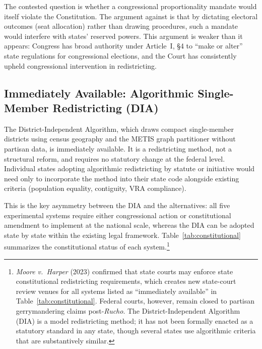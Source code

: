 The contested question is whether a congressional proportionality mandate would
itself violate the Constitution.  The argument against is that by dictating
electoral outcomes (seat allocation) rather than drawing procedures, such a
mandate would interfere with states' reserved powers.  This argument is weaker
than it appears: Congress has broad authority under Article~I, \S4 to
``make or alter'' state regulations for congressional elections, and the
Court has consistently upheld congressional intervention in redistricting.

\subsection{Immediately Available: Algorithmic Single-Member Redistricting (DIA)}

The District-Independent Algorithm, which draws compact single-member districts
using census geography and the METIS graph partitioner without partisan data,
is immediately available.  It is a redistricting method, not a structural
reform, and requires no statutory change at the federal level.  Individual
states adopting algorithmic redistricting by statute or initiative would need
only to incorporate the method into their state code alongside existing criteria
(population equality, contiguity, VRA compliance).

This is the key asymmetry between the DIA and the alternatives: all five
experimental systems require either congressional action or constitutional
amendment to implement at the national scale, whereas the DIA can be adopted
state by state within the existing legal framework.  Table~\ref{tab:constitutional}
summarizes the constitutional status of each system.\footnote{\emph{Moore v.\
Harper} (2023) confirmed that state courts may enforce state constitutional
redistricting requirements, which creates new state-court review venues for all
systems listed as ``immediately available'' in Table~\ref{tab:constitutional}.
Federal courts, however, remain closed to partisan gerrymandering claims
post-\emph{Rucho}.  The District-Independent Algorithm (DIA) is a model
redistricting method; it has not been formally enacted as a statutory standard
in any state, though several states use algorithmic criteria that are
substantively similar.}

